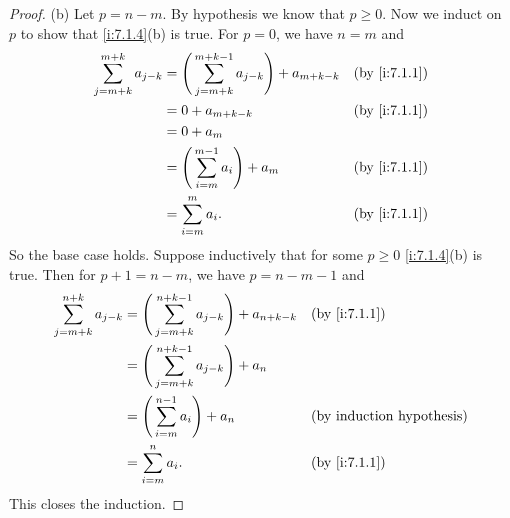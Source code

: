 \begin{proof}{(b)}
  Let \(p = n - m\).
  By hypothesis we know that \(p \geq 0\).
  Now we induct on \(p\) to show that \cref{i:7.1.4}(b) is true.
  For \(p = 0\), we have \(n = m\) and
  \begin{align*}
    \sum_{j = m + k}^{m + k} a_{j - k} & = \Bigg(\sum_{j = m + k}^{m + k - 1} a_{j - k}\Bigg) + a_{m + k - k} &  & \by{i:7.1.1} \\
                                       & = 0 + a_{m + k - k}                                                  &  & \by{i:7.1.1} \\
                                       & = 0 + a_m                                                                              \\
                                       & = \Bigg(\sum_{i = m}^{m - 1} a_i\Bigg) + a_m                         &  & \by{i:7.1.1} \\
                                       & = \sum_{i = m}^m a_i.                                                &  & \by{i:7.1.1}
  \end{align*}
  So the base case holds.
  Suppose inductively that for some \(p \geq 0\) \cref{i:7.1.4}(b) is true.
  Then for \(p + 1 = n - m\), we have \(p = n - m - 1\) and
  \begin{align*}
    \sum_{j = m + k}^{n + k} a_{j - k} & = \Bigg(\sum_{j = m + k}^{n + k - 1} a_{j - k}\Bigg) + a_{n + k - k} &  & \by{i:7.1.1} \\
                                       & = \Bigg(\sum_{j = m + k}^{n + k - 1} a_{j - k}\Bigg) + a_n                             \\
                                       & = \Bigg(\sum_{i = m}^{n - 1} a_i\Bigg) + a_n                         &  & \byIH        \\
                                       & = \sum_{i = m}^n a_i.                                                &  & \by{i:7.1.1}
  \end{align*}
  This closes the induction.
\end{proof}

